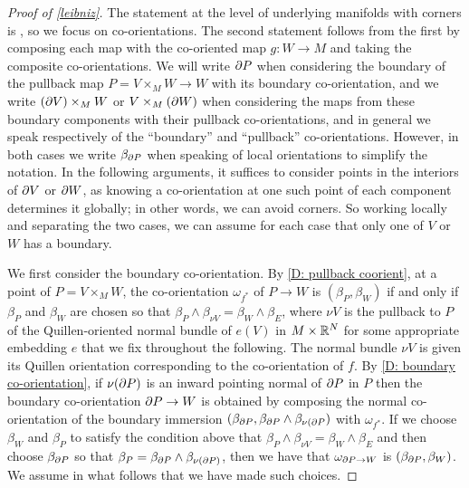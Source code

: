 \begin{proof}[Proof of \cref{leibniz}]
	The statement at the level of underlying manifolds with corners is \cite[Proposition 6.7]{Joy12}, so we focus on co-orientations.
	The second statement follows from the first by composing each map with the co-oriented map $g \colon W \to M$ and taking the composite co-orientations.
	We will write $\partial P$ when considering the boundary of the pullback map $P = V \times_M W \to W$ with its boundary co-orientation, and we write $(\partial V) \times_M W$ or $V \times_M (\partial W)$ when considering the maps from these boundary components with their pullback co-orientations, and in general we speak respectively of the ``boundary'' and ``pullback'' co-orientations.
	However, in both cases we write $\beta_{\partial P}$ when speaking of local orientations to simplify the notation.
	In the following arguments, it suffices to consider points in the interiors of $\partial V$ or $\partial W$, as knowing a co-orientation at one such point of each component determines it globally; in other words, we can avoid corners.
	So working locally and separating the two cases, we can assume for each case that only one of $V$ or $W$ has a boundary.

	We first consider the boundary co-orientation.
	By \cref{D: pullback coorient}, at a point of $P = V \times_M W$, the co-orientation $\omega_{f^*}$ of $P \to W$ is $(\beta_P,\beta_W)$ if and only if $\beta_P$ and $\beta_W$ are chosen so that $\beta_P \wedge \beta_{\nu V} = \beta_W \wedge \beta_E$, where $\nu V$ is the pullback to $P$ of the Quillen-oriented normal bundle of $e(V)$ in $M \times \mathbb{R}^N$ for some appropriate embedding $e$ that we fix throughout the following.
	The normal bundle $\nu V$ is given its Quillen orientation corresponding to the co-orientation of $f$.
	By \cref{D: boundary co-orientation}, if $\nu (\partial P)$ is an inward pointing normal of $\partial P$ in $P$ then the boundary co-orientation $\partial P \to W$ is obtained by composing the normal co-orientation of the boundary immersion $(\beta_{\partial P},\beta_{\partial P} \wedge \beta_{\nu (\partial P})$ with $\omega_{f^*}$.
	If we choose $\beta_W$ and $\beta_P$ to satisfy the condition above that $\beta_P \wedge \beta_{\nu V} = \beta_W \wedge \beta_E$ and then choose $\beta_{\partial P}$ so that $\beta_P = \beta_{\partial P} \wedge \beta_{\nu(\partial P)}$, then we have that $\omega_{\partial P \to W}$ is $(\beta_{\partial P},\beta_W)$.
	We assume in what follows that we have made such choices.


\end{proof}
